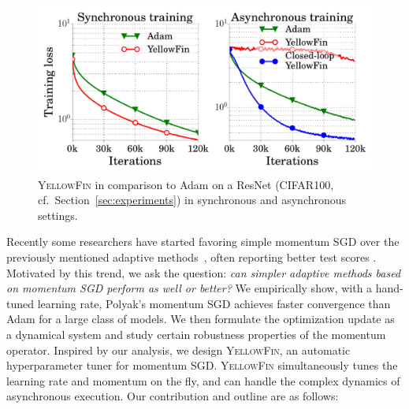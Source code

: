 \documentclass{article}
\newcommand{\tuner}{\textsc{YellowFin}\xspace}
\begin{document}
\begin{figure}[t]
	\includegraphics[width=0.99\linewidth]{experiment_results/spotlight.pdf}
	\vspace{-1em}
	\caption{\tuner in comparison to Adam on a ResNet (CIFAR100, cf.\ Section~\ref{sec:experiments}) in synchronous and asynchronous settings.}
	\label{fig:spotlight}
	\vspace{-0.5em}
\end{figure}
Recently some researchers
 have started favoring simple momentum SGD over the previously mentioned adaptive methods~\citep{chen2016thorough,gehring2017convolutional}, often reporting better test scores \citep{wilson2017marginal}.
Motivated by this trend, we ask the question:
\emph{can simpler adaptive methods based on momentum SGD perform as well or better?}
We empirically show, with a hand-tuned learning rate, Polyak's momentum SGD achieves faster convergence than Adam for a large class of models.
We then formulate the optimization update as a dynamical system and study certain robustness properties of the momentum operator.
Inspired by our analysis, we design \tuner, an automatic hyperparameter tuner for momentum SGD.
\tuner simultaneously tunes the learning rate and momentum on the fly, and can handle the complex dynamics of asynchronous execution.
Our contribution and outline are as follows:
\end{document}
